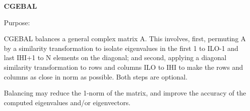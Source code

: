 {\bfseries C\+G\+E\+B\+A\+L} 

 \begin{DoxyParagraph}{Purpose\+: }
\begin{DoxyVerb} CGEBAL balances a general complex matrix A.  This involves, first,
 permuting A by a similarity transformation to isolate eigenvalues
 in the first 1 to ILO-1 and last IHI+1 to N elements on the
 diagonal; and second, applying a diagonal similarity transformation
 to rows and columns ILO to IHI to make the rows and columns as
 close in norm as possible.  Both steps are optional.

 Balancing may reduce the 1-norm of the matrix, and improve the
 accuracy of the computed eigenvalues and/or eigenvectors.\end{DoxyVerb}
 
\end{DoxyParagraph}

